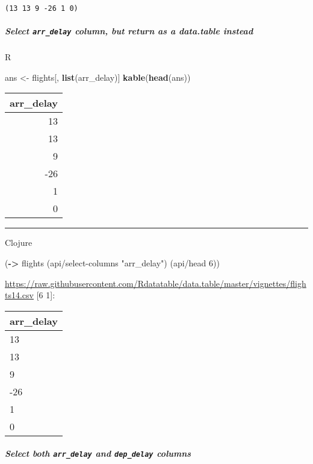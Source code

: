 \documentclass[]{article}
\newenvironment{Shaded}{\begin{snugshade}}{\end{snugshade}}
\newcommand{\DecValTok}[1]{\textcolor[rgb]{0.00,0.00,0.81}{#1}}
\newcommand{\KeywordTok}[1]{\textcolor[rgb]{0.13,0.29,0.53}{\textbf{#1}}}
\newcommand{\NormalTok}[1]{#1}
\newcommand{\StringTok}[1]{\textcolor[rgb]{0.31,0.60,0.02}{#1}}
\let\oldsubparagraph\subparagraph
\renewcommand{\subparagraph}[1]{\oldsubparagraph{#1}\mbox{}}
\begin{document}
\begin{verbatim}
(13 13 9 -26 1 0)
\end{verbatim}

\hypertarget{select-arr_delay-column-but-return-as-a-data.table-instead}{%
\subparagraph{\texorpdfstring{Select \texttt{arr\_delay} column, but
return as a data.table
instead}{Select arr\_delay column, but return as a data.table instead}}\label{select-arr_delay-column-but-return-as-a-data.table-instead}}

R

\begin{Shaded}
\begin{Highlighting}[]
\NormalTok{ans <-}\StringTok{ }\NormalTok{flights[, }\KeywordTok{list}\NormalTok{(arr_delay)]}
\KeywordTok{kable}\NormalTok{(}\KeywordTok{head}\NormalTok{(ans))}
\end{Highlighting}
\end{Shaded}

\begin{longtable}[]{@{}r@{}}
\toprule
arr\_delay\tabularnewline
\midrule
\endhead
13\tabularnewline
13\tabularnewline
9\tabularnewline
-26\tabularnewline
1\tabularnewline
0\tabularnewline
\bottomrule
\end{longtable}

\begin{center}\rule{0.5\linewidth}{0.5pt}\end{center}

Clojure

\begin{Shaded}
\begin{Highlighting}[]
\NormalTok{(}\KeywordTok{->}\NormalTok{ flights}
\NormalTok{    (api/select-columns }\StringTok{"arr_delay"}\NormalTok{)}
\NormalTok{    (api/head }\DecValTok{6}\NormalTok{))}
\end{Highlighting}
\end{Shaded}

\url{https://raw.githubusercontent.com/Rdatatable/data.table/master/vignettes/flights14.csv}
{[}6 1{]}:

\begin{longtable}[]{@{}l@{}}
\toprule
arr\_delay\tabularnewline
\midrule
\endhead
13\tabularnewline
13\tabularnewline
9\tabularnewline
-26\tabularnewline
1\tabularnewline
0\tabularnewline
\bottomrule
\end{longtable}

\hypertarget{select-both-arr_delay-and-dep_delay-columns}{%
\subparagraph{\texorpdfstring{Select both \texttt{arr\_delay} and
\texttt{dep\_delay}
columns}{Select both arr\_delay and dep\_delay columns}}\label{select-both-arr_delay-and-dep_delay-columns}}
\end{document}
